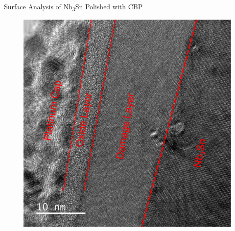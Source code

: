 \documentclass{beamer}
\begin{document}
\begin{frame}{}
\begin{columns}[t]
\begin{column}{0.32\linewidth}
\begin{block}{\label{sec:samplestudy}Surface Analysis of Nb\textsubscript{3}Sn Polished with CBP}
\begin{figure}
                        {\includegraphics[width=\columnwidth]{../doc/figs/Sample_Surface_Damage_Layer.png}}
                    \end{figure}

                \end{block}
            \end{column}






\end{columns}
\end{frame}
\end{document}
